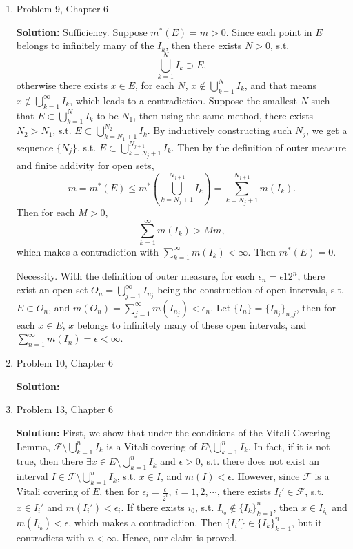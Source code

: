 \documentclass{article}%
\begin{document}
\begin{enumerate}
\item  Problem 9,  Chapter 6 

\smallskip
\textbf{Solution:}
\smallskip
Sufficiency. Suppose $m^*(E) = m > 0$. Since each point in $E$ belongs to infinitely many of the $I_k $, then there exists $N > 0$, s.t. 
$$
\bigcup_{k=1}^N I_k\supset E,
$$
otherwise there exists $x\in E$, for each $N$, $x\notin \bigcup\limits_{k=1}^N I_k $, and that means $x\notin \bigcup\limits_{k=1}^{\infty}I_k $, which leads to a contradiction. Suppose the smallest $N$ such that $E \subset \bigcup\limits_{k=1}^N I_k$ to be $N_1 $, then using the same method, there exists $N_2 > N_1 $, s.t. $E \subset \bigcup\limits_{k=N_1+1}^{N_2} I_k$. By inductively constructing such $N_j $, we get a sequence $\{N_j\}$, s.t. $E \subset \bigcup\limits_{k=N_j+1}^{N_{j+1}} I_k $. Then by the definition of outer measure and finite addivity for open sets, 
$$
m = m^*(E) \le m^*(\bigcup\limits_{k=N_j+1}^{N_{j+1}}I_k) = \sum_{k = N_j+1}^{N_{j+1}}m(I_k).
$$
Then for each $M > 0$,
$$
\sum_{k=1}^{\infty}m(I_k) > Mm, 
$$
which makes a contradiction with $\sum_{k=1}^{\infty}m(I_k) < \infty$. Then $m^*(E) = 0$.

Necessity. With the definition of outer measure, for each $\epsilon_n = \epsilon{1}{2^n} $, there exist an open set $O_n = \bigcup\limits_{j=1}^{\infty}I_{n_j} $ being the construction of open intervals, s.t. $E\subset O_n $, and $m(O_n) = \sum\limits_{j=1}^{\infty}m(I_{n_j}) < \epsilon_n $. Let $\{I_n\} = \{I_{n_j}\}_{n, j} $, then for each $x\in E$, $x$ belongs to infinitely many of these open intervals, and $\sum\limits_{n=1}^{\infty}m(I_n) = \epsilon < \infty$.

\bigskip
\item  Problem 10, Chapter 6

\smallskip
\textbf{Solution:}
\smallskip


\bigskip
\item  Problem 13, Chapter 6

\smallskip
\textbf{Solution:}
\smallskip
First, we show that under the conditions of the Vitali Covering Lemma, $\mathcal{F}\setminus \bigcup\limits_{k=1}^n I_k $ is a Vitali covering of $E\setminus \bigcup\limits_{k=1}^n I_k$. In fact, if it is not true, then there $\exists x\in E\setminus\bigcup\limits_{k=1}^n I_k$ and $\epsilon > 0$, s.t. there does not exist an interval $I\in\mathcal{F}\setminus\bigcup\limits_{k=1}^n I_k$, s.t. $x\in I$, and $m(I) < \epsilon$. However, since $\mathcal{F}$ is a Vitali covering of $E$, then for $\epsilon_i = \frac{\epsilon}{2^i}, ~i = 1, 2, \cdots $, there exists $I_i'\in\mathcal{F} $, s.t. $x\in I_i' $ and $m(I_i') < \epsilon_i $. If there exists $i_0 $, s.t. $I_{i_0}\notin \{I_k\}_{k = 1}^{n} $, then $x\in I_{i_0} $ and $m(I_{i_0}) < \epsilon$, which makes a contradiction. Then $\{I_i'\} \in \{I_k\}_{k = 1}^{n}$, but it contradicts with $n < \infty$. Hence, our claim is proved.


\end{enumerate}
\end{document}

